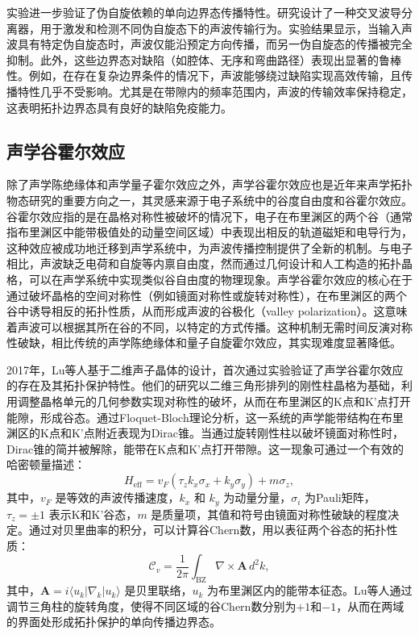 实验进一步验证了伪自旋依赖的单向边界态传播特性。研究设计了一种交叉波导分离器，用于激发和检测不同伪自旋态下的声波传输行为。实验结果显示，当输入声波具有特定伪自旋态时，声波仅能沿预定方向传播，而另一伪自旋态的传播被完全抑制。此外，这些边界态对缺陷（如腔体、无序和弯曲路径）表现出显著的鲁棒性。例如，在存在复杂边界条件的情况下，声波能够绕过缺陷实现高效传输，且传播特性几乎不受影响。尤其是在带隙内的频率范围内，声波的传输效率保持稳定，这表明拓扑边界态具有良好的缺陷免疫能力。

\subsection{声学谷霍尔效应}

除了声学陈绝缘体和声学量子霍尔效应之外，声学谷霍尔效应也是近年来声学拓扑物态研究的重要方向之一，其灵感来源于电子系统中的谷度自由度和谷霍尔效应。谷霍尔效应指的是在晶格对称性被破坏的情况下，电子在布里渊区的两个谷（通常指布里渊区中能带极值处的动量空间区域）中表现出相反的轨道磁矩和电导行为，这种效应被成功地迁移到声学系统中，为声波传播控制提供了全新的机制。与电子相比，声波缺乏电荷和自旋等内禀自由度，然而通过几何设计和人工构造的拓扑晶格，可以在声学系统中实现类似谷自由度的物理现象。声学谷霍尔效应的核心在于通过破坏晶格的空间对称性（例如镜面对称性或旋转对称性），在布里渊区的两个谷中诱导相反的拓扑性质，从而形成声波的谷极化（valley polarization）。这意味着声波可以根据其所在谷的不同，以特定的方式传播。这种机制无需时间反演对称性破缺，相比传统的声学陈绝缘体和量子自旋霍尔效应，其实现难度显著降低。

2017年，Lu等人基于二维声子晶体的设计，首次通过实验验证了声学谷霍尔效应的存在及其拓扑保护特性。他们的研究以二维三角形排列的刚性柱晶格为基础，利用调整晶格单元的几何参数实现对称性的破坏，从而在布里渊区的K点和K'点打开能隙，形成谷态。通过Floquet-Bloch理论分析，这一系统的声学能带结构在布里渊区的K点和K'点附近表现为Dirac锥。当通过旋转刚性柱以破坏镜面对称性时，Dirac锥的简并被解除，能带在K点和K'点打开带隙。这一现象可通过一个有效的哈密顿量描述：
\[
H_{\text{eff}} = v_F (\tau_z k_x \sigma_x + k_y \sigma_y) + m \sigma_z,
\]
其中，\(v_F\) 是等效的声波传播速度，\(k_x\) 和 \(k_y\) 为动量分量，\(\sigma_i\) 为Pauli矩阵，\(\tau_z = \pm 1\) 表示K和K'谷态，\(m\) 是质量项，其值和符号由镜面对称性破缺的程度决定。通过对贝里曲率的积分，可以计算谷Chern数，用以表征两个谷态的拓扑性质：
\[
\mathcal{C}_v = \frac{1}{2\pi} \int_{\text{BZ}} \nabla \times \mathbf{A} \, d^2k,
\]
其中，\(\mathbf{A} = i \langle u_k | \nabla_k | u_k \rangle\) 是贝里联络，\(u_k\) 为布里渊区内的能带本征态。Lu等人通过调节三角柱的旋转角度，使得不同区域的谷Chern数分别为\(+1\)和\(-1\)，从而在两域的界面处形成拓扑保护的单向传播边界态。

